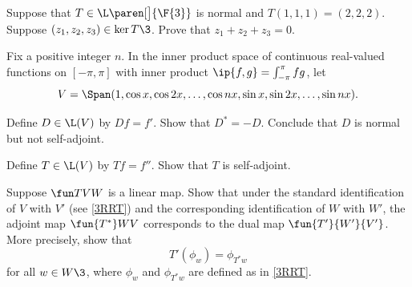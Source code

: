 \exercise
Suppose that $T \in \L\paren[\big]{\F{3}}$ is normal and $T(1,1,1) = (2,2,2)$. Suppose $(z_1, z_2, z_3) \in \ker T\3$. Prove that
$
z_1 + z_2 + z_3 = 0$.


\exercise
Fix a positive integer $n$. In the inner product space of
continuous real-valued functions on $[-\pi,\pi]$ with inner product
$
\ip{f, g} = \int_{-\pi}^{\pi} fg$,
let \label{1100}
\[ \addtolength{\belowdisplayskip}{-3bp}
V = \Span( 1, \cos x, \cos 2x, \dots, \cos nx, \sin x, \sin 2x, \dots, \sin nx).
\]
\begin{subtheorem}
\item
Define $D \in \L(V)$ by $Df = f'\!$. Show that $D^* = -D$. Conclude that $D$ is normal but not self-adjoint.
\item
Define $T \in \L(V)$ by $Tf = f''\!$. Show that $T$ is self-adjoint.
\end{subtheorem}
\exercisesubtheoremend


\exercise
Suppose $\fun T V W$ is a linear map. Show that under the standard identification of $V$ with $V'$ (see \ref{3RRT}) and the corresponding identification of $W$ with $W'\!$, the adjoint map $\fun {T^*} W V$ corresponds to the dual map $\fun {T'} {W'} {V'}$. More precisely, show that
\[
T' \! (\phi_w) = \phi_{T^* w}
\]
for all $w \in W\3$, where $\phi_w$ and $\phi_{T^* w}$  are defined as in \ref{3RRT}. \label{IdentifyTstarTprime}


